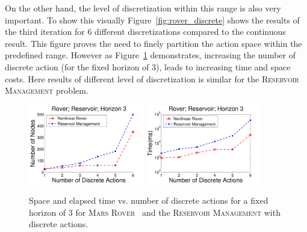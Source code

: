 \documentclass[twoside,11pt]{article}
\newcommand{\MarsRover}{\textsc{Mars Rover }}
\newcommand{\WaterReservoir}{\textsc{Reservoir Management }}
\begin{document}
On the other hand, the level of discretization within this range is also very important. To show this visually Figure~\ref{fig:rover_discrete} shows the results of the third iteration for 6 different discretizations compared to the continuous result. This figure proves the need to finely partition the action space within the predefined range. However as Figure~\ref{fig:roverDisSize} demonstrates, increasing the number of discrete action (for the fixed horizon of 3), leads to increasing time and space costs. Here results of different level of discretization is similar for the \WaterReservoir problem.

\begin{figure}[tbp!]
\vspace{-2mm}
\centering
\includegraphics[width=0.45\textwidth]{pics/disRovResNode2.pdf}
\hspace{2mm}
\includegraphics[width=0.45\textwidth]{pics/disRovResTime2.pdf}
\vspace{-2mm}
\caption{%
Space and elapsed time vs. number of discrete actions for a fixed horizon of 3  for  \MarsRover\ and the \WaterReservoir with discrete actions. 
}
\label{fig:roverDisSize}
\vspace{-5mm}
\end{figure}
\end{document}
